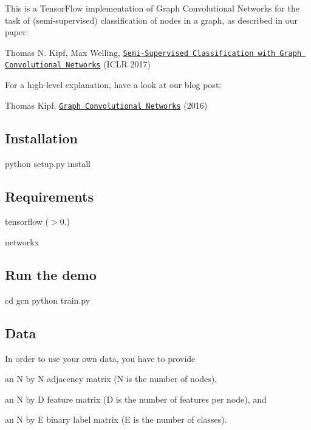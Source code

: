 This is a Tensor\+Flow implementation of Graph Convolutional Networks for the task of (semi-\/supervised) classification of nodes in a graph, as described in our paper\+:

Thomas N. Kipf, Max Welling, \href{http://arxiv.org/abs/1609.02907}{\tt Semi-\/\+Supervised Classification with Graph Convolutional Networks} (I\+C\+LR 2017)

For a high-\/level explanation, have a look at our blog post\+:

Thomas Kipf, \href{http://tkipf.github.io/graph-convolutional-networks/}{\tt Graph Convolutional Networks} (2016)

\subsection*{Installation}


\begin{DoxyCode}
python setup.py install
\end{DoxyCode}


\subsection*{Requirements}


\begin{DoxyItemize}
\item tensorflow ($>$0.)
\item networkx
\end{DoxyItemize}

\subsection*{Run the demo}


\begin{DoxyCode}
cd gcn
python train.py
\end{DoxyCode}


\subsection*{Data}

In order to use your own data, you have to provide
\begin{DoxyItemize}
\item an N by N adjacency matrix (N is the number of nodes),
\item an N by D feature matrix (D is the number of features per node), and
\item an N by E binary label matrix (E is the number of classes).
\end{DoxyItemize}

